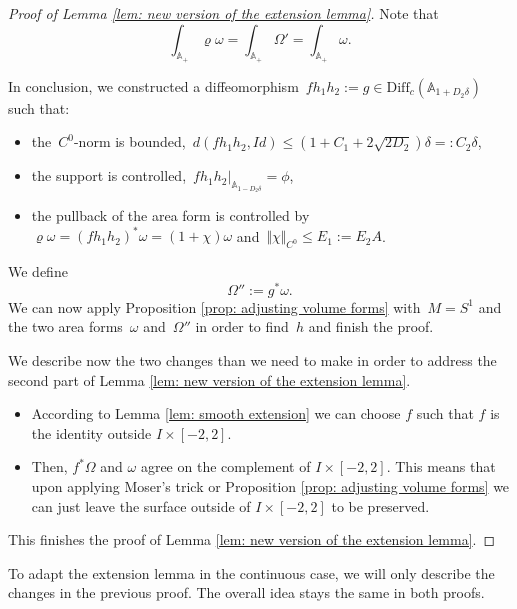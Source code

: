 \documentclass[10pt]{amsart}
\begin{document}
\begin{proof}[Proof of Lemma \ref{lem: new version of the extension lemma}]
Note that 
$$\int_{\mathbb{A}_+}\varrho\omega=\int_{\mathbb{A}_+}\Omega'=\int_{\mathbb{A}_+}\omega.$$

\medskip

In conclusion, we constructed a diffeomorphism~$fh_1h_2:=g \in \text{Diff}_c(\mathbb{A}_{1+D_2\delta})$ such that:
\begin{itemize}
    \item the~$C^0$-norm is bounded,~$d(fh_1h_2, Id)\leq (1+C_1+2\sqrt{2D_2})\delta=:C_2 \delta$,
    \item the support is controlled,~$fh_1h_2\vert_{\mathbb{A}_{1-D_2\delta}}=\phi$,
    \item the pullback of the area form is controlled by~$\varrho\omega= (fh_1h_2)^*\omega= (1+\chi)\omega$ and~$\Vert \chi \Vert_{C^0}\leq E_1:=E_2A$.
\end{itemize}

We define
$$\Omega'':=g^*\omega.$$
We can now apply Proposition \ref{prop: adjusting volume forms} with~$M=S^1$ and the two area forms~$\omega$ and~$\Omega''$ in order to find~$h$ and finish the proof.

We describe now the two changes than we need to make in order to address the second part of Lemma \ref{lem: new version of the extension lemma}.
\begin{itemize}
\item[$\bullet$] According to Lemma \ref{lem: smooth extension} we can choose $f$ such that $f$ is the identity outside $I \times [-2, 2]$.
\item[$\bullet$] Then, $f^* \Omega$ and $\omega$ agree on the complement of $I \times [-2, 2]$. This means that upon applying Moser's trick or Proposition \ref{prop: adjusting volume forms} we can just leave the surface outside of $I \times [-2, 2]$ to be preserved.
\end{itemize}
This finishes the proof of Lemma \ref{lem: new version of the extension lemma}.


\end{proof}


To adapt the extension lemma in the continuous case, we will only describe the changes in the previous proof. The overall idea stays the same in both proofs.
\end{document}
